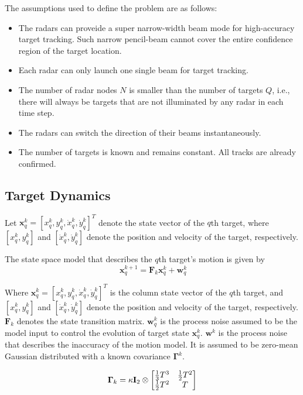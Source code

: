 \documentclass[12pt,journal,draftclsnofoot,onecolumn]{IEEEtran}
\begin{document}
 The assumptions used to define the problem are as follows:
\begin{itemize}
	\item The radars can proveide a super narrow-width beam mode for high-accuracy target tracking. Such narrow pencil-beam cannot cover the entire confidence region of the target location.
	\item Each radar can only launch one single beam for target tracking.
	\item The number of radar nodes $N$ is smaller than the number of targets $Q$, i.e., there will always be targets that are not illuminated by any radar in each time step.
	\item The radars can switch the direction of their beams instantaneously.
	\item The number of targets is known and remains constant. All tracks are already confirmed.
\end{itemize}


\subsection{Target Dynamics}
\label{sec:target}
Let $\mathbf{x}_q^k={[x_q^k, y_q^k, \dot{x}_q^k, \dot{y}_q^k]^T}$ denote the state vector of the $q$th target, where $\left[ x_q^k, y_q^k \right]$ and $\left[ \dot{x}_q^k, \dot{y}_q^k \right]$ denote the position and velocity of the target, respectively.

The state space model that describes the $q$th target's motion is given by
\begin{equation}\ \mathbf{x}_q^{k+1}=\mathbf{F}_k\mathbf{x}_q^k+\mathbf{w}_q^k
\end{equation}

Where $\mathbf{x}_q^k={[x_q^k, y_q^k, \dot{x}_q^k, \dot{y}_q^k]^T}$ is the column state vector of the $q$th target, and $\left[ x_q^k, y_q^k \right]$ and $\left[ \dot{x}_q^k, \dot{y}_q^k \right]$ denote the position and velocity of the target, respectively. $\mathbf{F}_k$ denotes the state transition matrix. ${\mathbf{w}_q^k} $ is the process noise assumed to be the model input to control the evolution of target state ${\mathbf{x}_q^k}$. $\mathbf{w}^k$ is the process noise that describes the inaccuracy of the motion model. It is assumed to be zero-mean Gaussian distributed with a known covariance $\mathbf{\Gamma}^k$.

\begin{equation}
	{\bf \Gamma}_{k}=\kappa {\bf I}_{2}\otimes\left[\begin{matrix} {1\over 3}T^{3}&{1\over 2}T^{2}\\ {1\over 2}T^{2}&T\end{matrix}\right]
\end{equation}
\end{document}
